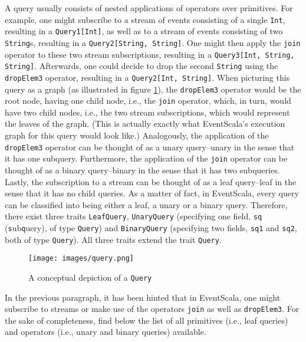 \documentclass[article, type=bsc, colorback, accentcolor=tud8b, parskip=half, bibliography=totocnumbered]{tudthesis}
\begin{document}
A query usually consists of nested applications of operators over primitives.
For example, one might subscribe to a stream of events consisting of a single \lstinline{Int}, resulting in a \lstinline{Query1[Int]}, as well as to a stream of events consisting of two \lstinline{String}s, resulting in a \lstinline{Query2[String, String]}.
One might then apply the \lstinline{join} operator to these two stream subscriptions, resulting in a \lstinline{Query3[Int, String, String]}.
Afterwards, one could decide to drop the second \lstinline{String} using the \lstinline{dropElem3} operator, resulting in a \lstinline{Query2[Int, String]}.
When picturing this query as a graph (as illustrated in figure \ref{fig:query}), the \lstinline{dropElem3} operator would be the root node, having one child node, i.e., the \lstinline{join} operator, which, in turn, would have two child nodes, i.e., the two stream subscriptions, which would represent the leaves of the graph.
(This is actually exactly what EventScala's execution graph for this query would look like.)
Analogously, the application of the \lstinline{dropElem3} operator can be thought of as a unary query--unary in the sense that it has one subquery.
Furthermore, the application of the \lstinline{join} operator can be thought of as a binary query--binary in the sense that it has two subqueries.
Lastly, the subscription to a stream can be thought of as a leaf query--leaf in the sense that it has no child queries.
As a matter of fact, in EventScala, every query can be classified into being either a leaf, a unary or a binary query.
Therefore, there exist three traits \lstinline{LeafQuery}, \lstinline{UnaryQuery} (specifying one field,  \lstinline{sq} (\lstinline{s}ub\lstinline{q}uery), of type \lstinline{Query}) and \lstinline{BinaryQuery} (specifying two fields, \lstinline{sq1} and \lstinline{sq2}, both of type \lstinline{Query}).
All three traits extend the trait \lstinline{Query}.

\begin{figure}
\caption{A conceptual depiction of a \lstinline{Query}}
\label{fig:query}
\texttt{[image: images/query.png]}
\centering
\end{figure}

In the previous paragraph, it has been hinted that in EventScala, one might subscribe to streams or make use of the operators \lstinline{join} as well as \lstinline{dropElem3}.
For the sake of completeness, find below the list of all primitives (i.e., leaf queries) and operators (i.e., unary and binary queries) available.
\end{document}
